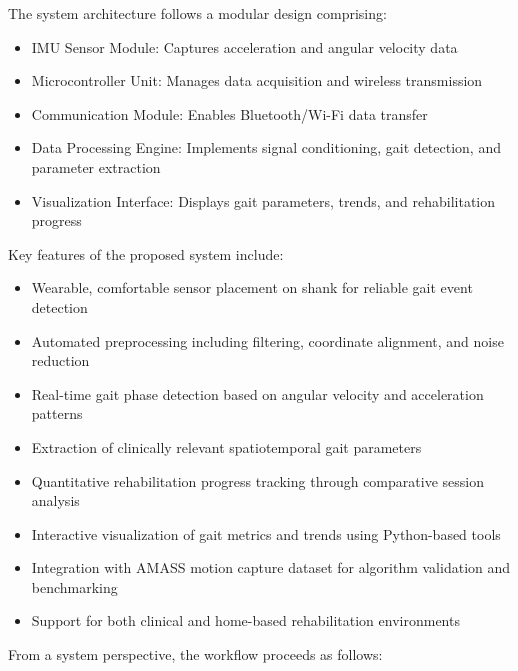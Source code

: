 \documentclass[12pt,a4paper]{report}
\begin{document}
The system architecture follows a modular design comprising:
\begin{itemize}
\item IMU Sensor Module: Captures acceleration and angular velocity data

\item Microcontroller Unit: Manages data acquisition and wireless transmission

\item Communication Module: Enables Bluetooth/Wi-Fi data transfer

\item Data Processing Engine: Implements signal conditioning, gait detection, and parameter extraction

\item Visualization Interface: Displays gait parameters, trends, and rehabilitation progress
\end{itemize}
Key features of the proposed system include:
\begin{itemize}
\item Wearable, comfortable sensor placement on shank for reliable gait event detection

\item Automated preprocessing including filtering, coordinate alignment, and noise reduction

\item Real-time gait phase detection based on angular velocity and acceleration patterns

\item Extraction of clinically relevant spatiotemporal gait parameters

\item Quantitative rehabilitation progress tracking through comparative session analysis

\item Interactive visualization of gait metrics and trends using Python-based tools

\item Integration with AMASS motion capture dataset for algorithm validation and benchmarking

\item Support for both clinical and home-based rehabilitation environments
\end{itemize}
From a system perspective, the workflow proceeds as follows:
\end{document}
